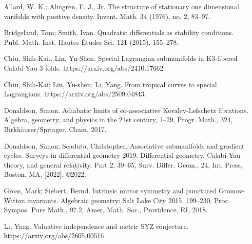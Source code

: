 \documentclass{article}
\theoremstyle{definition}
\begin{document}
		
		
		

		
		
		
		
		\thebibliography{}
		
		   Allard, W. K.; Almgren, F. J., Jr. The structure of stationary one dimensional varifolds with positive density. Invent. Math. 34 (1976), no. 2, 83--97.
		


	   Bridgeland, Tom; Smith, Ivan. Quadratic differentials as stability conditions. Publ. Math. Inst. Hautes Études Sci. 121 (2015), 155--278.



		
		 Chiu, Shih-Kai., Lin, Yu-Shen. Special Lagrangian submanifolds in K3-fibered Calabi-Yau 3-folds. https://arxiv.org/abs/2410.17662

		
		
		  Chiu, Shih-Kai; Lin, Yu-shen; Li, Yang. From tropical curves to special Lagrangians. https://arxiv.org/abs/2509.04843.

		
		
		Donaldson, Simon. Adiabatic limits of co-associative Kovalev-Lefschetz fibrations. Algebra, geometry, and physics in the 21st century, 1--29, Progr. Math., 324, Birkhäuser/Springer, Cham, 2017.
		
		
		
		Donaldson, Simon; Scaduto, Christopher. Associative submanifolds and gradient cycles. Surveys in differential geometry 2019. Differential geometry, Calabi-Yau theory, and general relativity. Part 2, 39--65, Surv. Differ. Geom., 24, Int. Press, Boston, MA, [2022], ©2022.
		
		
		
		
		
		Gross, Mark; Siebert, Bernd. Intrinsic mirror symmetry and punctured Gromov-Witten invariants. Algebraic geometry: Salt Lake City 2015, 199--230, Proc. Sympos. Pure Math., 97.2, Amer. Math. Soc., Providence, RI, 2018.

		
		

		
		
		
		Li, Yang. 
Valuative independence and metric SYZ conjecture. 
https://arxiv.org/abs/2605.00516
		
		
		
\end{document}
